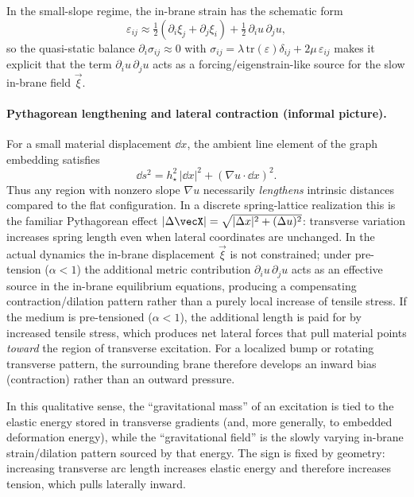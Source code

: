 In the small-slope regime, the in-brane strain has the schematic form
\begin{equation}
  \varepsilon_{ij}\approx \tfrac12(\partial_i\xi_j+\partial_j\xi_i)+\tfrac12\,\partial_i u\,\partial_j u,
  \label{eq:strain-near-identity}
\end{equation}
so the quasi-static balance $\partial_i\sigma_{ij}\approx 0$ with
$\sigma_{ij}=\lambda\,\mathrm{tr}(\varepsilon)\delta_{ij}+2\mu\,\varepsilon_{ij}$ makes it explicit that
the term $\partial_i u\,\partial_j u$ acts as a forcing/eigenstrain-like source for the slow in-brane field
$\vec\xi$.

\paragraph{Pythagorean lengthening and lateral contraction (informal picture).}
For a small material displacement $\dd x$, the ambient line element of the graph embedding satisfies
\begin{equation}
  \dd s^2 = h_\star^2\,|\dd x|^2 + (\nabla u\cdot \dd x)^2.
  \label{eq:line-element-graph}
\end{equation}
Thus any region with nonzero slope $\nabla u$ necessarily \emph{lengthens} intrinsic distances compared to the flat
configuration.
In a discrete spring-lattice realization this is the familiar Pythagorean effect
$|\Delta \vecX|=\sqrt{|\Delta x|^2+(\Delta u)^2}$: transverse variation increases spring length even when lateral
coordinates are unchanged.
In the actual dynamics the in-brane displacement $\vec\xi$ is not constrained; under pre-tension ($\alpha<1$) the
additional metric contribution $\partial_i u\,\partial_j u$ acts as an effective source in the in-brane equilibrium
equations, producing a compensating contraction/dilation pattern rather than a purely local increase of tensile stress.
If the medium is pre-tensioned ($\alpha<1$), the additional length is paid for by increased tensile stress,
which produces net lateral forces that pull material points \emph{toward} the region of transverse excitation.
For a localized bump or rotating transverse pattern, the surrounding brane therefore develops an inward bias
(contraction) rather than an outward pressure.

In this qualitative sense, the ``gravitational mass'' of an excitation is tied to the elastic energy stored in
transverse gradients (and, more generally, to embedded deformation energy), while the ``gravitational field'' is the
slowly varying in-brane strain/dilation pattern sourced by that energy.
The sign is fixed by geometry: increasing transverse arc length increases elastic energy and therefore increases
tension, which pulls laterally inward.


